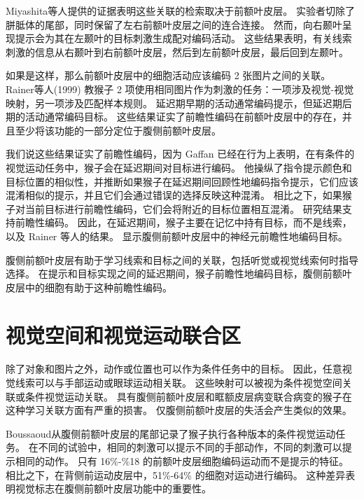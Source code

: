 Miyashita等人\cite{miyashita2004cognitive}提供的证据表明这些关联的检索取决于前额叶皮层。
实验者切除了胼胝体的尾部，同时保留了左右前额叶皮层之间的连合连接\cite{tomita1999top}。
然而，向右颞叶呈现提示会为其在左颞叶的目标刺激生成配对编码活动。 
这些结果表明，有关线索刺激的信息从右颞叶到右前额叶皮层，然后到左前额叶皮层，最后回到左颞叶\cite{hasegawa1998callosal,tomita1999top}。
\par


如果是这样，那么前额叶皮层中的细胞活动应该编码 2 张图片之间的关联。 
Rainer等人(1999) 教猴子 2 项使用相同图片作为刺激的任务：一项涉及视觉-视觉映射，另一项涉及匹配样本规则。 
延迟期早期的活动通常编码提示，但延迟期后期的活动通常编码目标。 
这些结果证实了前瞻性编码在前额叶皮层中的存在，并且至少将该功能的一部分定位于腹侧前额叶皮层。
\par


我们说这些结果证实了前瞻性编码，因为 Gaffan\cite{gaffan1977response} 已经在行为上表明，在有条件的视觉运动任务中，猴子会在延迟期间对目标进行编码。 
他操纵了指令提示颜色和目标位置的相似性，并推断如果猴子在延迟期间回顾性地编码指令提示，它们应该混淆相似的提示，并且它们会通过错误的选择反映这种混淆。 
相比之下，如果猴子对当前目标进行前瞻性编码，它们会将附近的目标位置相互混淆。
研究结果支持前瞻性编码。 
因此，在延迟期间，猴子主要在记忆中持有目标，而不是线索，以及 Rainer 等人的结果。 
显示腹侧前额叶皮层中的神经元前瞻性地编码目标。
\par


腹侧前额叶皮层有助于学习线索和目标之间的关联，包括听觉或视觉线索何时指导选择。
在提示和目标实现之间的延迟期间，猴子前瞻性地编码目标，腹侧前额叶皮层中的细胞有助于这种前瞻性编码。



\section{视觉空间和视觉运动联合区}
\par

除了对象和图片之外，动作或位置也可以作为条件任务中的目标。 
因此，任意视觉线索可以与手部运动\cite{bussey2001role}或眼球运动\cite{asaad1998neural}相关联。 
这些映射可以被视为条件视觉空间关联或条件视觉运动关联。 
具有腹侧前额叶皮层和眶额皮层病变联合病变的猴子在这种学习关联方面有严重的损害\cite{bussey2001role}。 
仅腹侧前额叶皮层的失活会产生类似的效果\cite{wang2000deficit}。
\par


Boussaoud\cite{boussaoud1993primate}从腹侧前额叶皮层的尾部记录了猴子执行各种版本的条件视觉运动任务。 
在不同的试验中，相同的刺激可以提示不同的手部动作，不同的刺激可以提示相同的动作。
只有 16\%-\%18 的前额叶皮层细胞编码运动而不是提示的特征。
相比之下，在背侧前运动皮层中，51\%-64\% 的细胞对运动进行编码。 
这种差异表明视觉标志在腹侧前额叶皮层功能中的重要性。
\par


